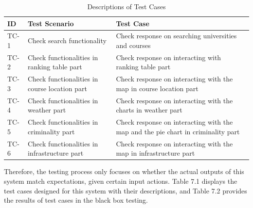 \begin{table}[H]
\centering
\caption{Descriptions of Test Cases}
\label{my-label}
\begin{tabular}{|l|p{4cm}|p{8cm}|}
\hline
\textbf{ID} & \textbf{Test Scenario}                        & \textbf{Test Case}                                                               \\ \hline
TC-1        & Check search functionality                    & Check response on searching universities and courses                             \\ \hline
TC-2        & Check functionalities in ranking table part   & Check response on interacting with ranking table part                            \\ \hline
TC-3        & Check functionalities in course location part & Check response on interacting with the map in course location part               \\ \hline
TC-4        & Check functionalities in weather part         & Check response on interacting with the charts in weather part                    \\ \hline
TC-5        & Check functionalities in criminality part     & Check response on interacting with the map and the pie chart in criminality part \\ \hline
TC-6        & Check functionalities in infrastructure part  & Check response on interacting with the map in infrastructure part                \\ \hline
\end{tabular}
\end{table}

Therefore, the testing process only focuses on whether the actual outputs of this system match expectations, given certain input actions. Table 7.1 displays the test cases designed for this system with their descriptions, and Table 7.2 provides the results of test cases in the black box testing.

